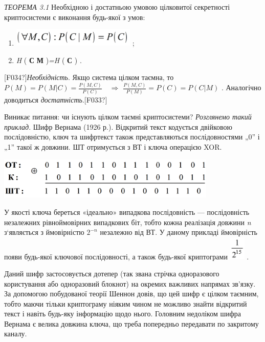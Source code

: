\bigskip

\textit{ТЕОРЕМА 3.1 }Необхідною і достатньою умовою цілковитої секретності
криптосистеми є виконання будь-якої  з умов:

\liststyleWWviiiNumxi
\begin{enumerate}
\item 
\includegraphics[width=2.3146in,height=0.3346in]{crypt-img/crypt-img24.png} ;
\item \textit{ H }( \textbf{С}\textbf{ {\textbar} }\textbf{М} )\textit{=H }(
\textbf{С }) .
\end{enumerate}
\textlatin{[F034?]}\textit{Необхідність}. Якщо система цілком таємна, то 
$P(M)=P(M|C)=\frac{P(M,C)}{P(C)}$  $ $ $ $ $\Rightarrow$ 
$\frac{P(M,C)}{P(M)}=P(C)=P(C|M)$ .  Аналогічно доводиться
\textit{достатність}.\textlatin{[F033?]}


\bigskip

Виникає питання: чи існують цілком таємні криптосистеми? \textit{Розглянемо
такий приклад}. Шифр Вернама (1926 р.). Відкритий текст кодується двійковою
послідовністю, ключ та шифртекст  також представляються послідовностями  „0” і
„1” такої ж довжини. ШТ отримується з ВТ і ключа операцією XOR.


\bigskip

 \includegraphics[width=4.111in,height=0.778in]{crypt-img/crypt-img25.png} 


\bigskip

У якості ключа береться «ідеально» випадкова послідовність --- послідовність
незалежних рівноймовірних випадкових біт, тобто кожна реалізація довжини 
\textit{n }з‘являється з ймовірністю  $2^{-n}$ незалежно від ВТ. У даному
прикладі ймовірність появи будь-якої ключової послідовності, а також будь-якої
криптограми  
\includegraphics[width=0.2917in,height=0.4437in]{crypt-img/crypt-img26.png} .

Даний шифр застосовується дотепер (так звана стрічка одноразового користування
або одноразовий блокнот) на окремих важливих напрямах зв’язку. За допомогою
побудованої теорії Шеннон  довів, що цей шифр  є цілком таємним, тобто маючи
тільки криптограму  ніяким чином не можливо знайти відкритий текст і навіть
будь-яку інформацію щодо нього. Головним недоліком шифра Вернама є велика
довжина ключа, що треба попередньо передавати по закритому каналу. 


